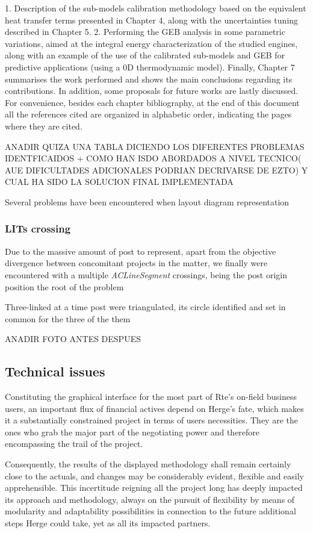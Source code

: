 1. Description of the sub-models calibration methodology based on the
equivalent heat transfer terms presented in Chapter 4, along with the
uncertainties tuning described in Chapter 5.
2. Performing the GEB analysis in some parametric variations, aimed at
the integral energy characterization of the studied engines, along with an
example of the use of the calibrated sub-models and GEB for predictive
applications (using a 0D thermodynamic model).
Finally, Chapter 7 summarises the work performed and shows the main
conclusions regarding its contributions. In addition, some proposals for future
works are lastly discussed.
For convenience, besides each chapter bibliography, at the end of this
document all the references cited are organized in alphabetic order, indicating
the pages where they are cited.

ANADIR QUIZA UNA TABLA DICIENDO LOS DIFERENTES PROBLEMAS IDENTFICAIDOS + COMO HAN ISDO ABORDADOS A NIVEL TECNICO( AUE DIFICULTADES ADICIONALES PODRIAN DECRIVARSE DE EZTO) Y CUAL HA SIDO LA SOLUCION FINAL IMPLEMENTADA

Several problems have been encountered when layout diagram representation
\subsubsection{LITs crossing}

Due to the massive amount of post to represent, apart from  the objective divergence between concomitant projects in the matter, we finally were encountered with a multiple \textit{ACLineSegment} crossings, being the post origin position the root of the problem

Three-linked at a time post were triangulated, its circle identified and set in common for the three of the them

ANADIR FOTO ANTES DESPUES

\subsection{Technical issues}
\label{subsub:AIG:technical-issues}

Constituting the graphical interface for the most part of Rte's on-field business users, an important flux of financial actives depend on Herge's fate, which makes it a substantially constrained project in terms of users necessities. They are the ones who grab the major part of the negotiating power and therefore encompassing the trail of the project.

Consequently, the results of the displayed methodology shall remain certainly close to the actuals, and changes may be considerably evident, flexible and easily apprehensible. This incertitude reigning all the project long has deeply impacted its approach and methodology, always on the pursuit of flexibility by means of modularity and adaptability possibilities in connection to the future additional steps Herge could take, yet as all its impacted partners.

